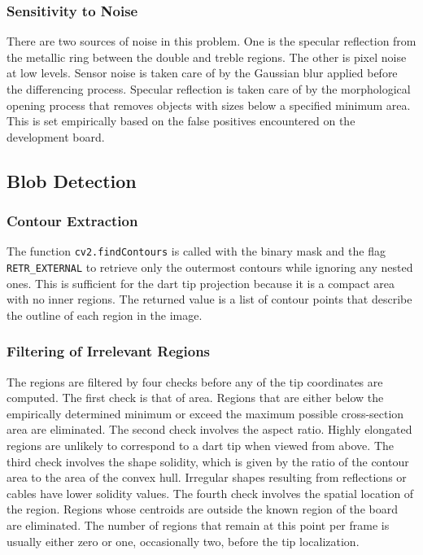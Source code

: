 \subsubsection{Sensitivity to Noise}
There are two sources of noise in this problem. One is the specular reflection from the metallic ring between the double and treble regions. The other is pixel noise at low levels. Sensor noise is taken care of by the Gaussian blur applied before the differencing process. Specular reflection is taken care of by the morphological opening process that removes objects with sizes below a specified minimum area. This is set empirically based on the false positives encountered on the development board.


\subsection{Blob Detection}

\subsubsection{Contour Extraction}
The function \texttt{cv2.findContours} is called with the binary mask and the flag
\texttt{RETR\_EXTERNAL} to retrieve only the outermost contours while ignoring any
nested ones. This is sufficient for the dart tip projection because it is a compact
area with no inner regions. The returned value is a list of contour points that
describe the outline of each region in the image.


\subsubsection{Filtering of Irrelevant Regions}
The regions are filtered by four checks before any of the tip coordinates are computed. The first check is that of area. Regions that are either below the empirically determined minimum or exceed the maximum possible cross-section area are eliminated. The second check involves the aspect ratio. Highly elongated regions are unlikely to correspond to a dart tip when viewed from above. The third check involves the shape solidity, which is given by the ratio of the contour area to the area of the convex hull. Irregular shapes resulting from reflections or cables have lower solidity values. The fourth check involves the spatial location of the region. Regions whose centroids are outside the known region of the board are eliminated. The number of regions that remain at this point per frame is usually either zero or one, occasionally two, before the tip localization.

